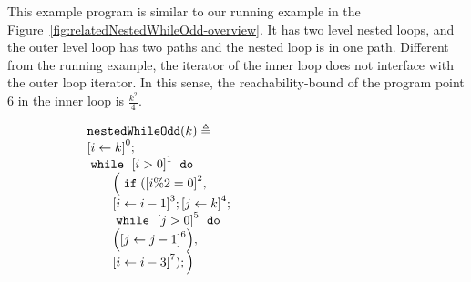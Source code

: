 \begin{example}
  \label{ex:nestedWhileOdd}
  This example program is similar to our running example in the Figure~\ref{fig:relatedNestedWhileOdd-overview}.
  It has two level nested loops, and the outer level loop has two paths and the nested loop is in one path.
  Different from the running example, the iterator of the inner loop
  does not interface with the outer loop iterator.
  In this sense, the reachability-bound of the program point $6$ in the inner loop is $\frac{k^2}{4}$.
  { \small
  \begin{figure}
  \centering
  \begin{subfigure}{.4\textwidth}
    \begin{centering}
    {\small
    $
    \begin{array}{l}
      \kw{nestedWhileOdd}(k) \triangleq \\
      \clabel{ \assign{i}{k} }^{0} ; \\
          \ewhile ~ \clabel{i > 0}^{1} ~ \edo ~ \\
          \qquad \Big(
            \eif(\clabel{i \% 2 = 0 }^{2},\\
            \qquad \clabel{\assign{i}{i - 1}}^{3};
            \clabel{\assign{j}{k}}^{4}; \\
            \qquad \ewhile ~ \clabel{j > 0}^{5} ~ \edo ~\\
            \qquad \Big( \clabel{\assign{j}{j - 1}}^{6} \Big),\\
            \qquad \clabel{\assign{i}{i - 3}}^{7});
            \Big)
      \end{array}
    $
    }
    \caption{}
    \end{centering}
    \end{subfigure}
  \begin{subfigure}{.55\textwidth}
    \begin{centering}
\end{centering}
\end{subfigure}
\end{figure}}
\end{example}
